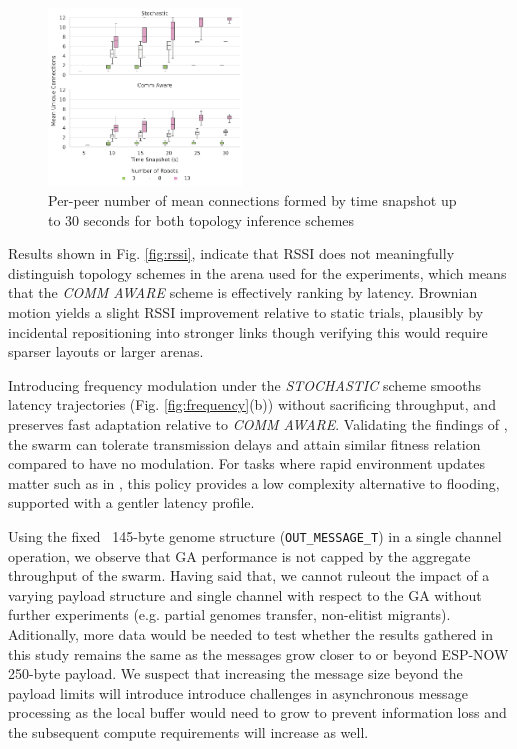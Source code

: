 \documentclass[conference]{IEEEtran}
\begin{document}
\begin{figure}[H]
    \centering
    \includegraphics[width=0.46\textwidth]{unique_connections.pdf}
    \caption{Per-peer number of mean connections formed by time snapshot up to 30 seconds for both topology inference schemes}
    \label{fig:unique-connections}
\end{figure}

Results shown in Fig. \ref{fig:rssi}, indicate that RSSI does not meaningfully distinguish topology schemes in the arena used for the experiments, which means that the \emph{COMM AWARE} scheme is effectively ranking by latency. Brownian motion yields a slight RSSI improvement relative to static trials, plausibly by incidental repositioning into stronger links though verifying this would require sparser layouts or larger arenas.

Introducing frequency modulation under the \emph{STOCHASTIC} scheme smooths latency trajectories (Fig. \ref{fig:frequency}(b)) without sacrificing throughput, and preserves fast adaptation relative to \emph{COMM AWARE}. Validating the findings of \cite{tsianos_impact_2012}, the swarm can tolerate transmission delays and attain similar fitness relation compared to have no modulation. For tasks where rapid environment updates matter such as in \cite{perrin_decentralised_2012}, this policy provides a low complexity alternative to flooding, supported with a gentler latency profile.

Using the fixed ~145-byte genome structure (\texttt{OUT\_MESSAGE\_T}) in a single channel operation, we observe that GA performance is not capped by the aggregate throughput of the swarm. Having said that, we cannot ruleout the impact of a varying payload structure and single channel with respect to the GA without further experiments (e.g. partial genomes transfer, non-elitist migrants). Aditionally, more data would be needed to test whether the results gathered in this study remains the same as the messages grow closer to or beyond ESP-NOW 250-byte payload. We suspect that increasing the message size beyond the payload limits will introduce introduce challenges in asynchronous message processing as the local buffer would need to grow to prevent information loss and the subsequent compute requirements will increase as well.\\
\end{document}
